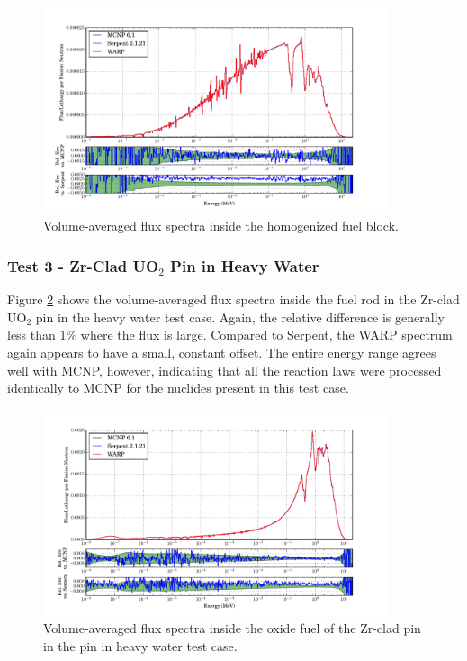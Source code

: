 \documentclass[preprint,12pt]{elsarticle}
\begin{document}
\begin{figure}[h!]
\centering
\includegraphics[width=0.9\textwidth,trim= 1cm 0cm 1cm 0cm]{graphics/homfuel_spec.pdf}
\caption{Volume-averaged flux spectra inside the homogenized fuel block. \label{homfuel_spec} }
\end{figure}

\newpage
\subsubsection{Test 3 - Zr-Clad UO$_2$ Pin in Heavy Water}

Figure \ref{pincell_spec} shows the volume-averaged flux spectra inside the fuel rod in the Zr-clad UO$_2$ pin in the heavy water test case.  Again, the relative difference is generally less than 1\% where the flux is large.  Compared to Serpent, the WARP spectrum again appears to have a small, constant offset.  The entire energy range agrees well with MCNP, however, indicating that all the reaction laws were processed identically to MCNP for the nuclides present in this test case.


\begin{figure}[h!]
\centering
\includegraphics[width=0.9\textwidth,trim= 1cm 0cm 1cm 0cm]{graphics/pincell_spec.pdf}
\caption{Volume-averaged flux spectra inside the oxide fuel of the Zr-clad pin in the pin in heavy water test case. \label{pincell_spec} }
\end{figure}
\end{document}
